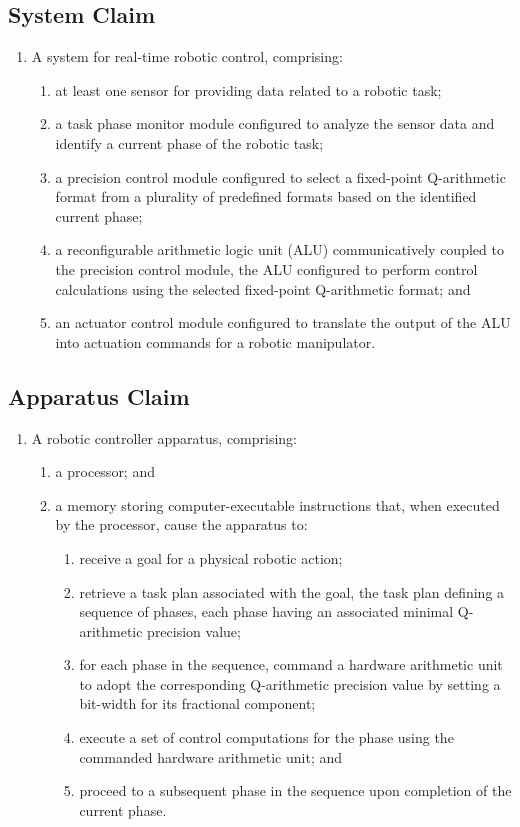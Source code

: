 \documentclass{article}
\begin{document}
\subsection{System Claim}
\begin{enumerate}[label=1.]
    \item A system for real-time robotic control, comprising:
    \begin{enumerate}[label=(\alph*)]
        \item at least one sensor for providing data related to a robotic task;
        \item a task phase monitor module configured to analyze the sensor data and identify a current phase of the robotic task;
        \item a precision control module configured to select a fixed-point Q-arithmetic format from a plurality of predefined formats based on the identified current phase;
        \item a reconfigurable arithmetic logic unit (ALU) communicatively coupled to the precision control module, the ALU configured to perform control calculations using the selected fixed-point Q-arithmetic format; and
        \item an actuator control module configured to translate the output of the ALU into actuation commands for a robotic manipulator.
    \end{enumerate}
\end{enumerate}

\subsection{Apparatus Claim}
\begin{enumerate}[label=1.]
    \item A robotic controller apparatus, comprising:
    \begin{enumerate}[label=(\alph*)]
        \item a processor; and
        \item a memory storing computer-executable instructions that, when executed by the processor, cause the apparatus to:
        \begin{enumerate}[label=(\roman*)]
            \item receive a goal for a physical robotic action;
            \item retrieve a task plan associated with the goal, the task plan defining a sequence of phases, each phase having an associated minimal Q-arithmetic precision value;
            \item for each phase in the sequence, command a hardware arithmetic unit to adopt the corresponding Q-arithmetic precision value by setting a bit-width for its fractional component;
            \item execute a set of control computations for the phase using the commanded hardware arithmetic unit; and
            \item proceed to a subsequent phase in the sequence upon completion of the current phase.
        \end{enumerate}
    \end{enumerate}
\end{enumerate}
\end{document}
